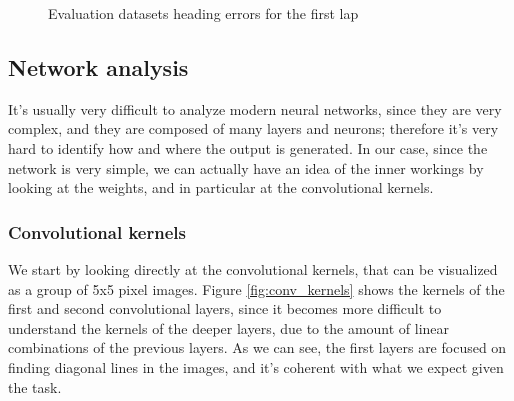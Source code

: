 \documentclass[a4paper,12pt,sort&compress]{article}
\begin{document}
\begin{figure}
    \centering
    \caption{Evaluation datasets heading errors for the first lap}
    \label{fig:dataset_analysis2}
\end{figure}


\clearpage

\subsection{Network analysis}
    It's usually very difficult to analyze modern neural networks, since they are very complex, and
    they are composed of many layers and neurons; therefore it's very hard to identify how and where
    the output is generated. In our case, since the network is very simple, we can actually have an
    idea of the inner workings by looking at the weights, and in particular at the convolutional
    kernels.  

\subsubsection*{Convolutional kernels}
    We start by looking directly at the convolutional kernels, that can be visualized as a group of 5x5 pixel
    images. Figure \ref{fig:conv_kernels} shows the kernels of the first and second convolutional
    layers, since it becomes more difficult to understand the kernels of the deeper layers, due to
    the amount of linear combinations of the previous layers. As we can see, the first layers are
    focused on finding diagonal lines in the images, and it's coherent with what we expect given the
    task.
    
\end{document}
